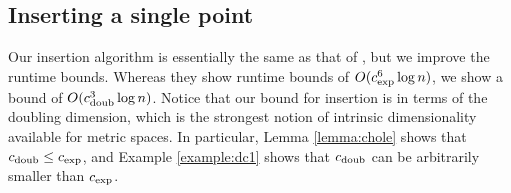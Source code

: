 \documentclass[thesis.tex]{subfiles}
\makeatletter
\newcommand{\dist}[2]{\distf({#1},{#2})}
\newcommand{\distf}{d}
\newcommand{\cexp}{c_\textnormal{exp}}
\newcommand{\cdoub}{c_\textnormal{doub}}
\newcommand{\eann}{(1+\varepsilon)\text{-ann}}
\newcommand{\q}{\ensuremath q}
\newcommand{\mkfunction}[1]{\ifmmode{\textnormal{{#1}}}}
\newcommand{\maxdist}[1]    {\mkfunction{maxdist}({#1})}
\newcommand{\data}[1]       {\mkfunction{data}({#1})}
\newcommand{\nn}[1]         {\mkfunction{nn}[{#1}]}
\def\nn{\@ifstar\@nn\@@nn}
\def\@nn#1{\mkfunction{nn}^*[{#1}]}
\def\@@nn#1{\mkfunction{nn}[{#1}]}
\newcommand{\findnn}{\mkprocedure{findnn}}
\makeatother
\begin{document}



\subsection{Inserting a single point}

Our insertion algorithm is essentially the same as that of \citet{beygelzimer2006cover},
but we improve the runtime bounds.
Whereas they show runtime bounds of $O(\cexp^6\log n)$,
we show a bound of $O(\cdoub^3\log n)$.
Notice that our bound for insertion is in terms of the doubling dimension,
which is the strongest notion of intrinsic dimensionality available for metric spaces.
In particular, Lemma \ref{lemma:chole} shows that $\cdoub \le \cexp$,
and Example \ref{example:dc1} shows that $\cdoub$ can be arbitrarily smaller than $\cexp$.
\end{document}
